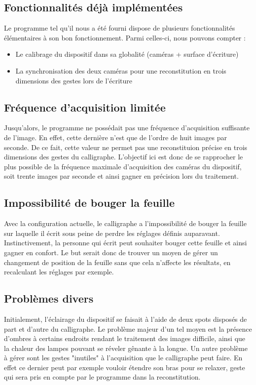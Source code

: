 \subsection{Fonctionnalités déjà implémentées}

Le programme tel qu'il nous a été fourni dispose de plusieurs fonctionnalités élémentaires à son bon fonctionnement. Parmi celles-ci, nous pouvons compter :
\begin{itemize}
\item Le calibrage du dispositif dans sa globalité (caméras + surface d'écriture)
\item La synchronisation des deux caméras pour une reconstitution en trois dimensions des gestes lors de l'écriture
\end{itemize}

\subsection{Fréquence d'acquisition limitée}

Jusqu'alors, le programme ne possédait pas une fréquence d'acquisition suffisante de l'image. En effet, cette dernière n'est que de l'ordre de huit images par seconde. De ce fait, cette valeur ne permet pas une reconstituion précise en trois dimensions des gestes du calligraphe. L'objectif ici est donc de se rapprocher le plus possible de la fréquence maximale d'acquisition des caméras du dispositif, soit trente images par seconde et ainsi gagner en précision lors du traitement.

\subsection{Impossibilité de bouger la feuille}

Avec la configuration actuelle, le calligraphe a l'impossibilité de bouger la feuille sur laquelle il écrit sous peine de perdre les réglages définis auparavant. Instinctivement, la personne qui écrit peut souhaiter bouger cette feuille et ainsi gagner en confort. Le but serait donc de trouver un moyen de gérer un changement de position de la feuille sans que cela n'affecte les résultats, en recalculant les réglages par exemple.

\subsection{Problèmes divers}

Initialement, l'éclairage du dispositif se faisait à l'aide de deux spots disposés de part et d'autre du calligraphe. Le problème majeur d'un tel moyen est la présence d'ombres à certains endroits rendant le traitement des images difficile, ainsi que la chaleur des lampes pouvant se réveler gênante à la longue. Un autre problème à gérer sont les gestes "inutiles" à l'acquisition que le calligraphe peut faire. En effet ce dernier peut par exemple vouloir étendre son bras pour se relaxer, geste qui sera pris en compte par le programme dans la reconstitution.